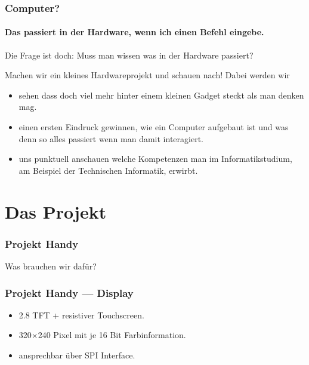 \begin{frame}[allowframebreaks]
	\frametitle{Computer?}
	\framesubtitle{Das passiert in der Hardware, wenn ich einen Befehl
	eingebe.}

	\begin{block}{Die Frage ist doch:}
		Muss man wissen was in der Hardware passiert?
	\end{block}

	\framebreak

	\begin{block}{Machen wir ein kleines Hardwareprojekt und schauen nach!}
		Dabei werden wir
		\begin{itemize}
			\item sehen dass doch viel mehr hinter einem kleinen Gadget
				steckt als man denken mag.
			\item einen ersten Eindruck gewinnen, wie ein Computer aufgebaut ist und was denn so alles
				passiert wenn man damit interagiert.
			\item uns punktuell anschauen welche Kompetenzen man im Informatikstudium, am Beispiel
				der Technischen Informatik, erwirbt.
		\end{itemize}
	\end{block}
\end{frame}

\section{Das Projekt}
\begin{frame}
	\frametitle{Projekt Handy}



	\pause

	\begin{center}
		Was brauchen wir dafür?
	\end{center}
\end{frame}

\begin{frame}
	\frametitle{Projekt Handy --- Display}

	\vspace{-0.5cm}

	\begin{itemize}
		\item \SI{2.8}{\inch} TFT + resistiver Touchscreen.
		\item 320$\times$240 Pixel mit je 16 Bit Farbinformation.
		\item ansprechbar über SPI Interface.
	\end{itemize}
\end{frame}

